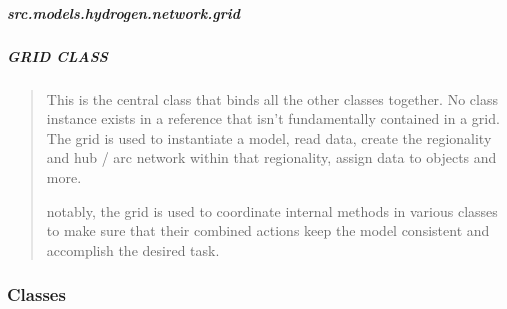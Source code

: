 \documentclass[letterpaper,10pt,english]{sphinxmanual}
\begin{document}
\sphinxstepscope


\subparagraph{src.models.hydrogen.network.grid}
\label{\detokenize{src.models.hydrogen.network.grid:module-src.models.hydrogen.network.grid}}\label{\detokenize{src.models.hydrogen.network.grid:src-models-hydrogen-network-grid}}\label{\detokenize{src.models.hydrogen.network.grid::doc}}

\subparagraph{GRID CLASS}
\label{\detokenize{src.models.hydrogen.network.grid:grid-class}}\begin{quote}

\sphinxAtStartPar
This is the central class that binds all the other classes together. No class
instance exists in a reference that isn’t fundamentally contained in a grid.
The grid is used to instantiate a model, read data, create the regionality
and hub / arc network within that regionality, assign data to objects and more.

\sphinxAtStartPar
notably, the grid is used to coordinate internal methods in various classes to
make sure that their combined actions keep the model consistent and accomplish
the desired task.
\end{quote}
\subsubsection*{Classes}
\end{document}
